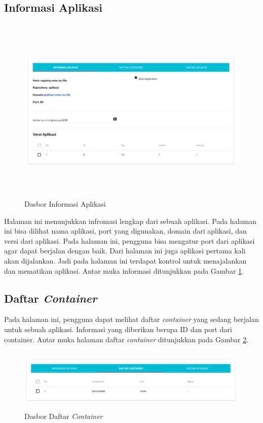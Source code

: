         \subsection{Informasi Aplikasi}
         	\begin{figure}[H]
				\centering
				\includegraphics[width=11.2cm,height=9cm]{Images/C-4/dasinformasi.PNG}
				\caption{Dasbor Informasi Aplikasi}
				\label{dinformasiaplikasi}
			\end{figure}
         	Halaman ini menunjukkan infromasi lengkap dari sebuah aplikasi. Pada halaman ini bisa dilihat nama aplikasi, port yang digunakan, domain dari aplikasi, dan versi dari aplikasi. Pada halaman ini, pengguna bisa mengatur port dari aplikasi agar dapat berjalan dengan baik. Dari halaman ini juga aplikasi pertama kali akan dijalankan. Jadi pada halaman ini terdapat kontrol untuk menajalankan dan mematikan aplikasi. Antar muka informasi ditunjukkan pada Gambar \ref{dinformasiaplikasi}.
            
         \subsection{Daftar \textit{Container}}
         	Pada halaman ini, pengguna dapat melihat daftar \textit{container} yang sedang berjalan untuk sebuah aplikasi. Informasi yang diberikan berupa ID dan port dari container. Antar muka halaman daftar \textit{container} ditunjukkan pada Gambar \ref{ddaftarcontainer}.
            \begin{figure}[H]
				\centering
				\includegraphics[width=11.2cm,height=3cm]{Images/C-4/dasdafcont.PNG}
				\caption{Dasbor Daftar \textit{Container}}
				\label{ddaftarcontainer}
			\end{figure}
            
